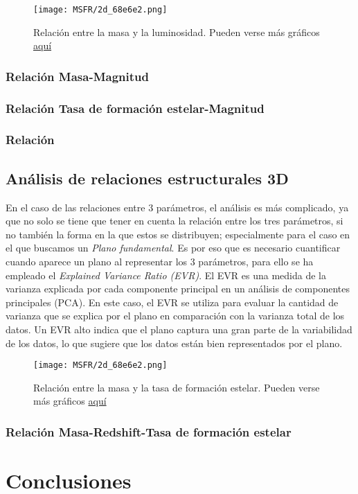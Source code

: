 \documentclass[11pt, a4paper]{article} %
\begin{document}
\begin{figure}[H]
    \centering
    \texttt{[image: MSFR/2d\_68e6e2.png]}
    \caption{Relación entre la masa y la luminosidad. Pueden verse más gráficos \href{URL}{aquí}}
    \label{fig:LM}
\end{figure}
\subsubsection{Relación Masa-Magnitud}
\subsubsection{Relación Tasa de formación estelar-Magnitud}
\subsubsection{Relación }
\subsection{Análisis de relaciones estructurales 3D}

En el caso de las relaciones entre 3 parámetros, el análisis es más complicado, ya que no solo se tiene que tener en cuenta la relación entre los tres parámetros, si no también la forma en la que estos se distribuyen; especialmente para el caso en el que buscamos un \textit{Plano fundamental}. 
Es por eso que es necesario cuantificar cuando aparece un plano al representar los 3 parámetros, para ello se ha empleado el \textit{Explained Variance Ratio (EVR)}. El EVR es una medida de la varianza explicada por cada componente principal en un análisis de componentes principales (PCA). 
En este caso, el EVR se utiliza para evaluar la cantidad de varianza que se explica por el plano en comparación con la varianza total de los datos. Un EVR alto indica que el plano captura una gran parte de la variabilidad de los datos, lo que sugiere que los datos están bien representados por el plano.

\begin{figure}[H]
    \centering
    \texttt{[image: MSFR/2d\_68e6e2.png]}
    \caption{Relación entre la masa y la tasa de formación estelar. Pueden verse más gráficos \href{https://github.com/PhyAMR/TFG/tree/main/MSFR}{aquí}}
    \label{fig:MSFR}
\end{figure}

\subsubsection{Relación Masa-Redshift-Tasa de formación estelar}
\section{Conclusiones}


\printbibliography

\end{document}
